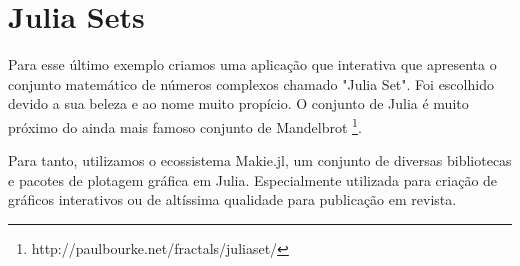





\section{Julia Sets}
Para esse último exemplo criamos uma aplicação que interativa que apresenta o conjunto matemático de números complexos chamado "Julia Set". Foi escolhido devido a sua beleza e ao nome muito propício. O conjunto de Julia é muito próximo do ainda mais famoso conjunto de Mandelbrot \footnote{http://paulbourke.net/fractals/juliaset/}. 

Para tanto, utilizamos o ecossistema Makie.jl, um conjunto de diversas bibliotecas e pacotes de plotagem gráfica em Julia. Especialmente utilizada para criação de gráficos interativos ou de altíssima qualidade para publicação em revista. 



